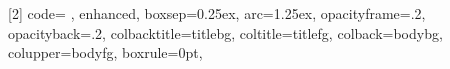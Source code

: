 

\makeatletter
\newenvironment{labeling}[2][]{%
	\def\sc@septext{#1}%
	\list{}{\settowidth{\labelwidth}{{%
					#2%
					\sc@septext%
				}}%
		\leftmargin\labelwidth \advance\leftmargin by \labelsep
		\let\makelabel\labelinglabel
	}%
}{%
	\endlist
}
\newcommand\labelinglabel[1]{%
	#1\hfil
	\sc@septext%
}
\makeatother

\newenvironment{blockcolor}
{\begin{alertblock}
		}
		{

		\centering
		\texttt{[image: figures/batik.png]}
	\end{alertblock}
}

\newcommand{\notes}[1]{\note{\vfill
		{#1}
		\vfill
	}}

\usepackage[most]{tcolorbox}
[2]{%
	code={%
		},
	enhanced,
	boxsep=0.25ex,
	arc=1.25ex,
	opacityframe=.2,
	opacityback=.2,
	colbacktitle=titlebg,
	coltitle=titlefg,
	colback=bodybg,
	colupper=bodyfg,
	boxrule=0pt,
}


